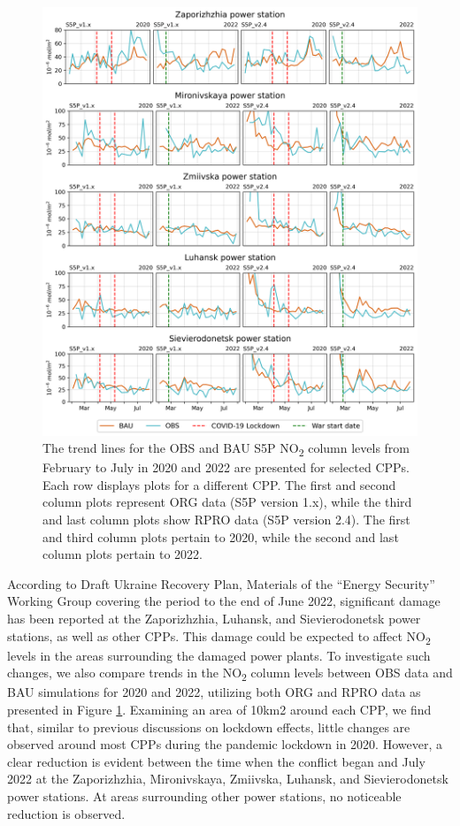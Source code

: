 \begin{figure}[p]
    \centering
    \includegraphics[width=\textwidth]{figs/chap3/fig9.png}
    \caption[OBS and BAU S5P NO\textsubscript{2} trends (2020-2022) for selected CPPs]{The trend lines for the OBS and BAU S5P NO\textsubscript{2} column levels from February to July in 2020 and 2022 are presented for selected CPPs. Each row displays plots for a different CPP. The first and second column plots represent ORG data (S5P version 1.x), while the third and last column plots show RPRO data (S5P version 2.4). The first and third column plots pertain to 2020, while the second and last column plots pertain to 2022.}
    \label{fig:chap3_fig9}
\end{figure}

According to Draft Ukraine Recovery Plan, Materials of the “Energy Security” Working Group covering the period to the end of June 2022, significant damage has been reported at the Zaporizhzhia, Luhansk, and Sievierodonetsk power stations, as well as other CPPs. This damage could be expected to affect NO\textsubscript{2} levels in the areas surrounding the damaged power plants. To investigate such changes, we also compare trends in the NO\textsubscript{2} column levels between OBS data and BAU simulations for 2020 and 2022, utilizing both ORG and RPRO data as presented in Figure \ref{fig:chap3_fig9}. Examining an area of 10km2 around each CPP, we find that, similar to previous discussions on lockdown effects, little changes are observed around most CPPs during the pandemic lockdown in 2020. However, a clear reduction is evident between the time when the conflict began and July 2022 at the Zaporizhzhia, Mironivskaya, Zmiivska, Luhansk, and Sievierodonetsk power stations. At areas surrounding other power stations, no noticeable reduction is observed.\par

